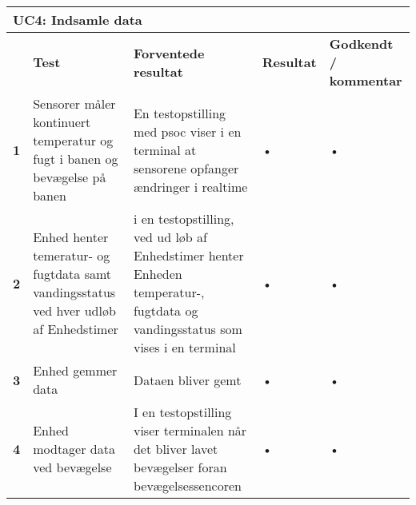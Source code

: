 
\begin{longtable}{|p{5mm}|p{40mm}|p{40mm}|p{20mm}|p{25mm}|}
\hline 
\multicolumn{5}{|l|}{\textbf{UC4: Indsamle data}} \\ 
\hline 
& \textbf{Test} & \textbf{Forventede resultat} & \textbf{Resultat} & \textbf{Godkendt / kommentar} \\ 
\hline 
\textbf{1}& Sensorer måler kontinuert temperatur og fugt i banen og bevægelse på banen & En testopstilling med psoc viser i en terminal at sensorene opfanger ændringer i realtime & • & • \\ 
\hline 
\textbf{2}& Enhed henter temeratur- og fugtdata samt vandingsstatus ved hver udløb af Enhedstimer & i en testopstilling, ved ud løb af Enhedstimer henter Enheden temperatur-, fugtdata og vandingsstatus som vises i en terminal  & • & • \\ 
\hline 
\textbf{3}& Enhed gemmer data & Dataen bliver gemt & • & • \\ 
\hline 
\textbf{4}& Enhed modtager data ved bevægelse & I en testopstilling viser terminalen når det bliver lavet bevægelser foran bevægelsessencoren & • & • \\ 
\hline 
\end{longtable} 